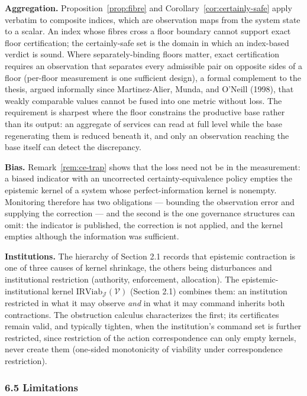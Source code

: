 \documentclass[11pt]{article}
\theoremstyle{definition}
\begin{document}
\textbf{Aggregation.} Proposition~\ref{prop:fibre} and Corollary~\ref{cor:certainly-safe} apply verbatim to
composite indices, which are observation maps from the system state to a
scalar. An index whose fibres cross a floor boundary cannot support
exact floor certification; the certainly-safe set is the domain in which an index-based verdict is sound. Where separately-binding floors matter, exact
certification requires an observation that separates every admissible
pair on opposite sides of a floor (per-floor measurement is one sufficient design), a formal complement to the thesis, argued informally since Martinez-Alier, Munda, and O'Neill (1998), that weakly comparable
values cannot be fused into one metric without loss. The requirement is
sharpest where the floor constrains the productive base rather than its
output: an aggregate of services can read at full level while the base
regenerating them is reduced beneath it, and only an observation
reaching the base itself can detect the discrepancy.

\textbf{Bias.} Remark~\ref{rem:ce-trap} shows that the loss need not be in the
measurement: a biased indicator with an uncorrected
certainty-equivalence policy empties the epistemic kernel of a system
whose perfect-information kernel is nonempty. Monitoring therefore has
two obligations --- bounding the observation error and supplying the
correction --- and the second is the one governance structures can omit: the indicator is published, the correction is not applied,
and the kernel empties although the information was sufficient.

\textbf{Institutions.} The hierarchy of Section 2.1 records that
epistemic contraction is one of three causes of kernel shrinkage, the
others being disturbances and institutional restriction (authority,
enforcement, allocation). The epistemic-institutional kernel \(\mathrm{IRViab}_{\mathcal{J}}(\mathcal{V})\) (Section 2.1) combines them: an institution restricted in what it
may observe \emph{and} in what it may command inherits both
contractions. The obstruction calculus characterizes the first; its certificates remain valid, and typically tighten, when the institution's command set is further restricted, since restriction of
the action correspondence can only empty kernels, never create them
(one-sided monotonicity of viability under correspondence restriction).

\subsubsection{6.5 Limitations}\label{limitations}
\end{document}
